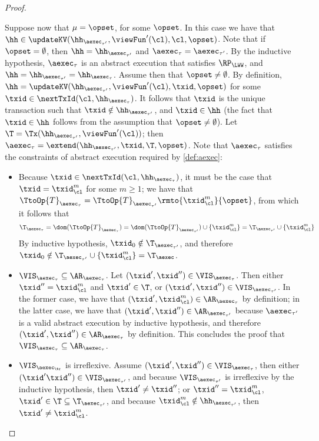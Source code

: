 \begin{proof}
\begin{itemize}
Suppose now that $\mu = \opset$, for some $\opset$. In this case we have that  
$\hh \in \updateKV(\hh_{\aexec_{\tau'}}, \viewFun'(\cl), \cl, \opset)$. Note that if 
$\opset = \emptyset$, then $\hh = \hh_{\aexec_{\tau'}}$ and $\aexec_{\tau} = \aexec_{\tau'}$. 
By the inductive hypothesis, $\aexec_{\tau}$ is an abstract execution that satisfies 
$\RP_{\LWW}$, and $\hh = \hh_{\aexec_{\tau'}} = \hh_{\aexec_{\tau}}$. 
Assume then that $\opset \neq \emptyset$. By definition, $\hh = \updateKV(\hh_{\aexec_{\tau'}}, 
\viewFun'(\cl), \txid, \opset)$ for some $\txid \in \nextTxId(\cl, \hh_{\aexec_{\tau}})$. It follows that $\txid$ 
is the unique transaction such that $\txid \notin \hh_{\aexec_{\tau'}}$, and $\txid \in \hh$ 
(the fact that $\txid \in \hh$ follows from the assumption that $\opset \neq \emptyset$). Let 
$\T = \Tx(\hh_{\aexec_{\tau'}}, \viewFun'(\cl))$; then $\aexec_{\tau} = \extend(\hh_{\aexec_{\tau'}}, \txid, \T, \opset)$. 
Note that $\aexec_{\tau}$ satisfies the constraints of abstract execution required by \cref{def:aexec}:
\begin{itemize}
\item  Because $\txid \in \nextTxId(\cl, \hh_{\aexec_{\tau}})$, it must be the case that $\txid = \txid_{\cl}^{m}$ for some 
$m \geq 1$; we have that $\TtoOp{T}_{\aexec_{\tau}} = \TtoOp{T}_{\aexec_{\tau'}}\rmto{\txid_{\cl}^{m}}{\opset}$, 
from which it follows that 
\[
\T_{\aexec_{\tau}} = \dom(\TtoOp{T}_{\aexec_{\tau}}) = \dom(\TtoOp{T}_{\aexec_{\tau'}}) \cup 
\{\txid_{\cl}^{m} \} = \T_{\aexec_{\tau'}} \cup \{\txid_{\cl}^{m} \}
\]
By inductive hypothesis, $\txid_0 \notin \T_{\aexec_{\tau'}}$, and therefore $\txid_{0} \notin 
\T_{\aexec_{\tau'}} \cup \{\txid_{\cl}^{m} \} = \T_{\aexec}$.

\item \( \VIS_{\aexec_{\tau}} \subseteq \AR_{\aexec_{\tau}} \).
    Let $(\txid' ,\txid'') \in \VIS_{\aexec_{\tau}}$. Then either $\txid'' = \txid_{\cl}^{m}$ and $\txid' \in \T$, or $(\txid', \txid'') \in 
\VIS_{\aexec_{\tau'}}$. In the former case, we have that $(\txid', \txid_{\cl}^{m}) \in \AR_{\aexec_{\tau}}$ by definition; 
in the latter case, we have that $(\txid', \txid'') \in \AR_{\aexec_{\tau'}}$ because $\aexec_{\tau'}$ is a valid 
abstract execution by inductive hypothesis, and therefore $(\txid', \txid'') \in \AR_{\aexec_{\tau}}$ by definition. 
This concludes the proof that $\VIS_{\aexec_{\tau}} \subseteq \AR_{\aexec_{\tau}}$. 
\item \( \VIS_{\aexec_\tr} \) is irreflexive.
Assume $(\txid', \txid'') \in \VIS_{\aexec_{\tau}}$, then either 
$(\txid' \txid'') \in \VIS_{\aexec_{\tau'}}$, and because $\VIS_{\aexec_{\tau'}}$ is irreflexive by the inductive hypothesis, 
then $\txid' \neq \txid''$; 
or $\txid'' = \txid_{\cl}^{m}$, $\txid' \in \T \subseteq \T_{\aexec_{\tau'}}$, 
and because $\txid_{\cl}^{m} \notin \hh_{\aexec_{\tau'}}$, then $\txid' \neq \txid_{\cl}^{m}$. 


\end{itemize}
\end{itemize}
\end{proof}
